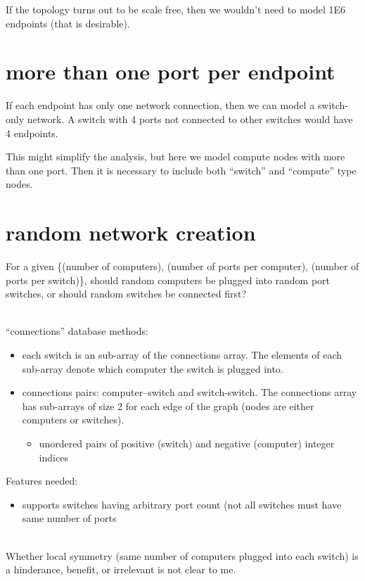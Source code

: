 \documentclass[pdftex]{article}
\begin{document}
If the topology turns out to be scale free, then we wouldn't need to model 1E6 endpoints (that is desirable).

\section{more than one port per endpoint}

If each endpoint has only one network connection, then we can model a switch-only network. A switch with 4 ports not connected to other switches would have 4 endpoints.

This might simplify the analysis, but here we model compute nodes with more than one port. Then it is necessary to include both ``switch'' and ``compute'' type nodes.

\section{random network creation}

For a given \{(number of computers), (number of ports per computer), (number of ports per switch)\}, should random computers be plugged into random port switches, or should random switches be connected first?

\ \\
``connections'' database methods:
\begin{itemize}
 \item each switch is an sub-array of the connections array. The elements of each sub-array denote which computer the switch is plugged into. 
 \item connections pairs: computer--switch and switch-switch. The connections array has sub-arrays of size 2 for each edge of the graph (nodes are either computers or switches).
 \begin{itemize}
  \item unordered pairs of positive (switch) and negative (computer) integer indices
 \end{itemize}

\end{itemize}
Features needed:
 \begin{itemize}
  \item supports switches having arbitrary port count (not all switches must have same number of ports
 \end{itemize}


\ \\
Whether local symmetry (same number of computers plugged into each switch) is a hinderance, benefit, or irrelevant is not clear to me.
\end{document}
